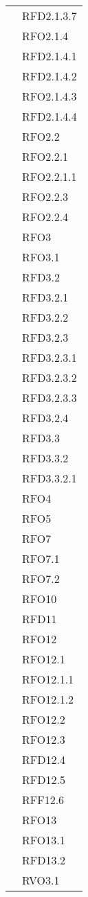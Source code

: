 \begin{longtable}{|>{\centering}m{10cm}|m{3cm}<{\centering}|}
& RFD2.1.3.7\\
& RFO2.1.4\\
& RFD2.1.4.1\\
& RFD2.1.4.2\\
& RFO2.1.4.3\\
& RFD2.1.4.4\\
& RFO2.2\\
& RFO2.2.1\\
& RFO2.2.1.1\\
& RFO2.2.3\\
& RFO2.2.4\\
& RFO3\\
& RFO3.1\\
& RFD3.2\\
& RFD3.2.1\\
& RFD3.2.2\\
& RFD3.2.3\\
& RFD3.2.3.1\\
& RFD3.2.3.2\\
& RFD3.2.3.3\\
& RFD3.2.4\\
& RFD3.3\\
& RFD3.3.2\\
& RFD3.3.2.1\\
& RFO4\\
& RFO5\\
& RFO7\\
& RFO7.1\\
& RFO7.2\\
& RFO10\\
& RFD11\\
& RFO12\\
& RFO12.1\\
& RFO12.1.1\\
& RFO12.1.2\\
& RFO12.2\\
& RFO12.3\\
& RFD12.4\\
& RFD12.5\\
& RFF12.6\\
& RFO13\\
& RFO13.1\\
& RFD13.2\\
& RVO3.1\\ \hline


\end{longtable}
